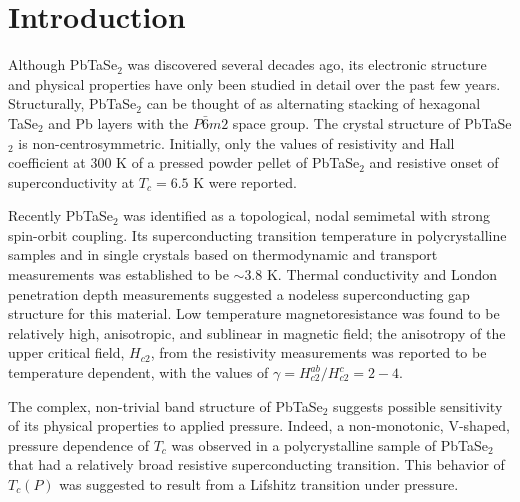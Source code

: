 \documentclass[aps,prb,preprint,groupedaddress,showpacs,amsmath,amssymb]{revtex4}
\begin{document}
\maketitle

\section{Introduction}

Although PbTaSe$_2$ was discovered several decades ago, \cite{epp80a,epp81a} its electronic structure and physical properties have only been studied in  detail over the past few years. \cite{bia16a,ali14a,wan15a,wan16a,pan16a,zha16a} Structurally, PbTaSe$_2$ can be thought of  as alternating stacking of hexagonal TaSe$_2$ and Pb layers with the $P\bar{6}m2$ space group. The crystal structure of PbTaSe$_2$ is non-centrosymmetric. \cite{epp80a} Initially, only the values of resistivity and Hall coefficient at 300 K of a pressed powder pellet of PbTaSe$_2$ and resistive onset of superconductivity at $T_c = 6.5$ K were reported. \cite{epp81a}

Recently PbTaSe$_2$ was identified as a topological, nodal semimetal with strong spin-orbit coupling. \cite{bia16a} Its superconducting transition temperature in polycrystalline samples \cite{ali14a,wan15a} and in single crystals \cite{wan16a,pan16a,zha16a} based on thermodynamic and transport measurements was established to be $\sim 3.8$ K. Thermal conductivity and  London penetration depth measurements \cite{wan16a,pan16a} suggested a nodeless superconducting gap structure for this material. Low temperature magnetoresistance was found
 to be relatively high, anisotropic, and sublinear in magnetic field; the anisotropy of the upper critical field, $H_{c2}$, from the resistivity measurements was reported to be temperature dependent, with the values of $\gamma = H_{c2}^{ab}/H_{c2}^c = 2 - 4$. \cite{zha16a}

The complex, non-trivial band structure of  PbTaSe$_2$ \cite{bia16a,ali14a,zha16a} suggests possible sensitivity of its physical properties to applied pressure. Indeed, a non-monotonic, V-shaped, pressure dependence of $T_c$ was observed in a polycrystalline sample of PbTaSe$_2$ that had a relatively broad resistive superconducting transition. \cite{wan15a} This behavior of $T_c(P)$ was suggested to result from a Lifshitz transition under pressure.
\end{document}
